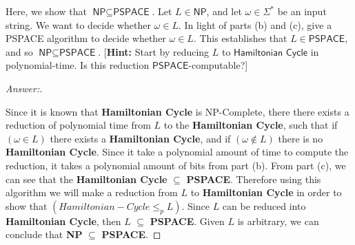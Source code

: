 \documentclass[11pt]{article}
\theoremstyle{definition}
\theoremstyle{definition}
\theoremstyle{definition}
\begin{document}
\begin{enumerate}[label=(\alph*)]
\vskip 15pt
\item Here, we show that $\textsf{NP} \subseteq \textsf{PSPACE}$. Let $L \in \textsf{NP}$, and let $\omega \in \Sigma^{*}$ be an input string. We want to decide whether $\omega \in L$. In light of parts (b) and (c), give a \textsf{PSPACE} algorithm to decide whether $\omega \in L$. This establishes that $L \in \textsf{PSPACE}$, and so $\textsf{NP} \subseteq \textsf{PSPACE}$.  [\textbf{Hint:} Start by reducing $L$ to $\textsf{Hamiltonian Cycle}$ in polynomial-time. Is this reduction $\textsf{PSPACE}$-computable?]

\begin{proof}[Answer:] \
\item Since it is known that \textbf{Hamiltonian Cycle} is NP-Complete, there there exists a reduction of polynomial time from $L$ to the \textbf{Hamiltonian Cycle}, such that if $(\omega \in L)$ there exists a \textbf{Hamiltonian Cycle}, and if $(\omega \notin L)$ there is no \textbf{Hamiltonian Cycle}. Since it take a polynomial amount of time to compute the reduction, it takes a polynomial amount of bits from part (b). From part (c), we can see that the  \textbf{Hamiltonian Cycle} $\subseteq$ \textbf{PSPACE}. Therefore using this algorithm we will make a reduction from $L$ to \textbf{Hamiltonian Cycle} in order to show that $(Hamiltonian-Cycle \leq_p L)$. Since $L$ can be reduced into \textbf{Hamiltonian Cycle}, then $L$ $\subseteq$ \textbf{PSPACE}. Given $L$ is arbitrary, we can conclude that \textbf{NP} $\subseteq$ \textbf{PSPACE}.

\end{proof}
 
\end{enumerate}
\end{document}
